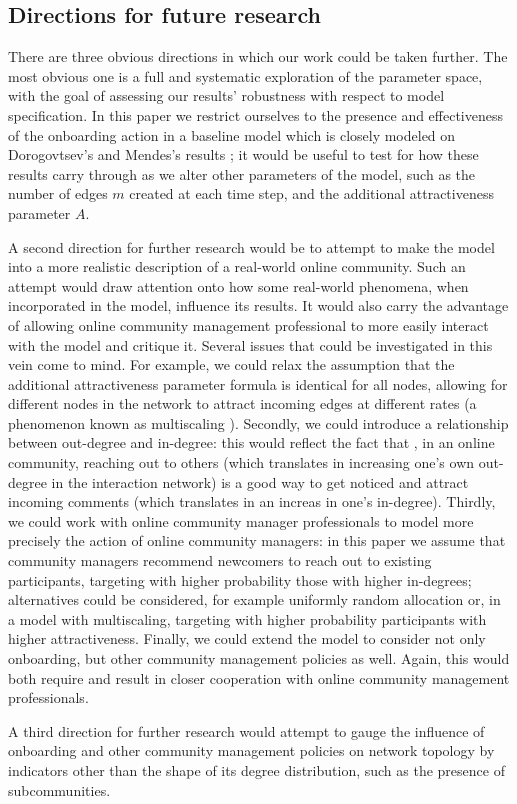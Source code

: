 \subsection{Directions for future research}

There are three obvious directions in which our work could be taken further. The most obvious one is a full and systematic exploration of the parameter space, with the goal of assessing our results' robustness with respect to model specification. In this paper we restrict ourselves to the presence and effectiveness of the onboarding action in a baseline model which is closely modeled on Dorogovtsev's and Mendes's results \cite{dorogovtsev2002evolution}; it would be useful to test for how these results carry through as we alter other parameters of the model, such as the number of edges $m$ created at each time step, and the additional attractiveness parameter $A$. 

A second direction for further research would be to attempt to make the model into a more realistic description of a real-world online community. Such an attempt would draw attention onto how some real-world phenomena, when incorporated in the model, influence its results. It would also carry the advantage of allowing online community management professional to more easily interact with the model and critique it. Several issues that could be investigated in this vein come to mind. For example, we could relax the assumption that the additional attractiveness parameter formula is identical for all nodes, allowing for different nodes in the network to attract incoming edges at different rates (a phenomenon known as multiscaling \cite{bianconi2001competition}). Secondly, we could introduce a relationship between out-degree and in-degree: this would reflect the fact that , in an online community, reaching out to others (which translates in increasing one's own out-degree in the interaction network) is a good way to get noticed and attract incoming comments (which translates in an increas in one's in-degree). Thirdly, we could work with online community manager professionals to model more precisely the action of online community managers: in this paper we assume that community managers recommend newcomers to reach out to existing participants, targeting with higher probability those with higher in-degrees; alternatives could be considered, for example uniformly random allocation or, in a model with multiscaling, targeting with higher probability participants with higher attractiveness. Finally, we could extend the model to consider not only onboarding, but other community management policies as well. Again, this would both require and result in closer cooperation with online community management professionals.

A third direction for further research would attempt to gauge the influence of onboarding and other community management policies on network topology by indicators other than the shape of its degree distribution, such as the presence of subcommunities. 

